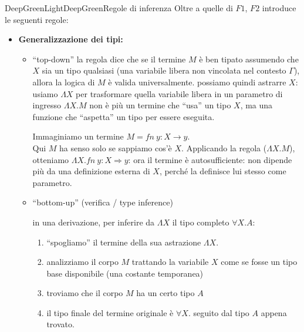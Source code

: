 \documentclass[a4paper,11pt]{report}
\begin{document}
\begin{cdefframe}{DeepGreenLight}{DeepGreen}{Regole di inferenza}{}
    Oltre a quelle di \( F1 \), \( F2 \) introduce le seguenti regole:
    \begin{itemize}
    \item \textbf{Generalizzazione dei tipi:}
    \begin{prooftree}
    \end{prooftree}

    \begin{gframe}{}
\begin{itemize}
    \item ``top-down''
        \subitem la regola dice che se il termine \( M \) è ben tipato assumendo che \( X \) sia un tipo qualsiasi (una variabile libera non vincolata nel contesto \( \Gamma \)), allora la logica di \( M \) è valida universalmente.
        \subitem possiamo quindi astrarre \( X \): usiamo \( \Lambda X \) per trasformare quella variabile libera in un parametro di ingresso
        \subitem \( \Lambda X. M \) non è più un termine che ``usa'' un tipo \( X \), ma una funzione che ``aspetta'' un tipo per essere eseguita.

        \begin{gframe}{}
        Immaginiamo un termine $M = fn \ y: X \to y$.\\
        Qui $M$ ha senso solo se sappiamo cos'è $X$. Applicando la regola ($\Lambda X. M$), otteniamo $\Lambda X. fn \ y:X \Rightarrow y$: ora il termine è autosufficiente: non dipende più da una definizione esterna di $X$, perché la definisce lui stesso come parametro.
        \end{gframe}

\item ``bottom-up'' (verifica / type inference)

    \subitem in una derivazione, per inferire da \( \Lambda X \) il tipo completo \( \forall X. A \):
\begin{enumerate}
    \item ``spogliamo'' il termine della sua astrazione \( \Lambda X \).
    \item analizziamo il corpo \( M \) trattando la variabile \( X \) come se fosse un tipo base disponibile (una costante temporanea)
    \item troviamo che il corpo \( M \) ha un certo tipo \( A \)     
    \item il tipo finale del termine originale è \( \forall X. \) seguito dal tipo \( A \) appena trovato.
\end{enumerate}
\end{itemize}
\end{gframe}


\end{itemize}
\end{cdefframe}
\end{document}
